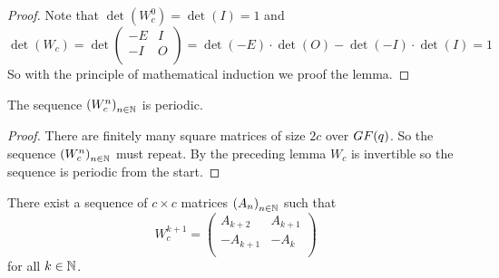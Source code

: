 \begin{proof}
  Note that $\det(W_{c}^{0}) = \det(I) = 1$ and 
  \[
  \det(W_{c}) = \det
  \left(
  \begin{array}{cc}
    -E & I \\
    -I & O \\
  \end{array}
  \right)
  =
  \det(-E) \cdot \det(O) - \det(-I) \cdot \det(I)
  =
  1
  \]
  So with the principle of mathematical induction we proof the lemma.
\end{proof}

\begin{theorem}
  The sequence $\left(W_{c}^{n}\right)_{n\in\mathbb{N}}$ is periodic.
\end{theorem}

\begin{proof}
  There are finitely many square matrices of size $2c$ over
  $GF(q)$. So the sequence $\left(W_{c}^{n}\right)_{n\in\mathbb{N}}$ must
  repeat. By the preceding lemma $W_{c}$ is invertible so the
  sequence is periodic from the start.
\end{proof}

\begin{lemma}[$W$-structure]
  There exist a sequence of $c \times c$ matrices
  $\left(A_{n}\right)_{n\in\mathbb{N}}$ such that
  \[
  W_{c}^{k+1}
  =
  \left(
  \begin{array}{cc}
     A_{k+2} &  A_{k+1} \\
    -A_{k+1} & -A_{k}   \\
  \end{array}
  \right)  
  \]
  for all $k\in\mathbb{N}$.
\end{lemma}

